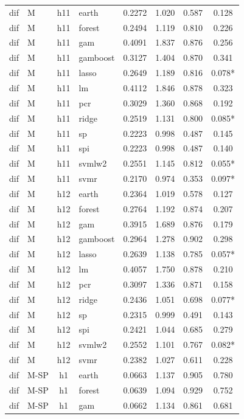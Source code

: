 \begin{ThreePartTable}
\begin{longtable}[t]{llclcccc}
\addlinespace
dif & M & h11 & earth & 0.2272 & 1.020 & 0.587 & 0.128\\
dif & M & h11 & forest & 0.2494 & 1.119 & 0.810 & 0.226\\
dif & M & h11 & gam & 0.4091 & 1.837 & 0.876 & 0.256\\
dif & M & h11 & gamboost & 0.3127 & 1.404 & 0.870 & 0.341\\
dif & M & h11 & lasso & 0.2649 & 1.189 & 0.816 & 0.078*\\
dif & M & h11 & lm & 0.4112 & 1.846 & 0.878 & 0.323\\
dif & M & h11 & pcr & 0.3029 & 1.360 & 0.868 & 0.192\\
dif & M & h11 & ridge & 0.2519 & 1.131 & 0.800 & 0.085*\\
dif & M & h11 & sp & 0.2223 & 0.998 & 0.487 & 0.145\\
dif & M & h11 & spi & 0.2223 & 0.998 & 0.487 & 0.140\\
dif & M & h11 & svmlw2 & 0.2551 & 1.145 & 0.812 & 0.055*\\
dif & M & h11 & svmr & 0.2170 & 0.974 & 0.353 & 0.097*\\
\addlinespace
dif & M & h12 & earth & 0.2364 & 1.019 & 0.578 & 0.127\\
dif & M & h12 & forest & 0.2764 & 1.192 & 0.874 & 0.207\\
dif & M & h12 & gam & 0.3915 & 1.689 & 0.876 & 0.179\\
dif & M & h12 & gamboost & 0.2964 & 1.278 & 0.902 & 0.298\\
dif & M & h12 & lasso & 0.2639 & 1.138 & 0.785 & 0.057*\\
dif & M & h12 & lm & 0.4057 & 1.750 & 0.878 & 0.210\\
dif & M & h12 & pcr & 0.3097 & 1.336 & 0.871 & 0.158\\
dif & M & h12 & ridge & 0.2436 & 1.051 & 0.698 & 0.077*\\
dif & M & h12 & sp & 0.2315 & 0.999 & 0.491 & 0.143\\
dif & M & h12 & spi & 0.2421 & 1.044 & 0.685 & 0.279\\
dif & M & h12 & svmlw2 & 0.2552 & 1.101 & 0.767 & 0.082*\\
dif & M & h12 & svmr & 0.2382 & 1.027 & 0.611 & 0.228\\
\addlinespace
dif & M-SP & h1 & earth & 0.0663 & 1.137 & 0.905 & 0.780\\
dif & M-SP & h1 & forest & 0.0639 & 1.094 & 0.929 & 0.752\\
dif & M-SP & h1 & gam & 0.0662 & 1.134 & 0.861 & 0.681\\

\end{longtable}
\end{ThreePartTable}
